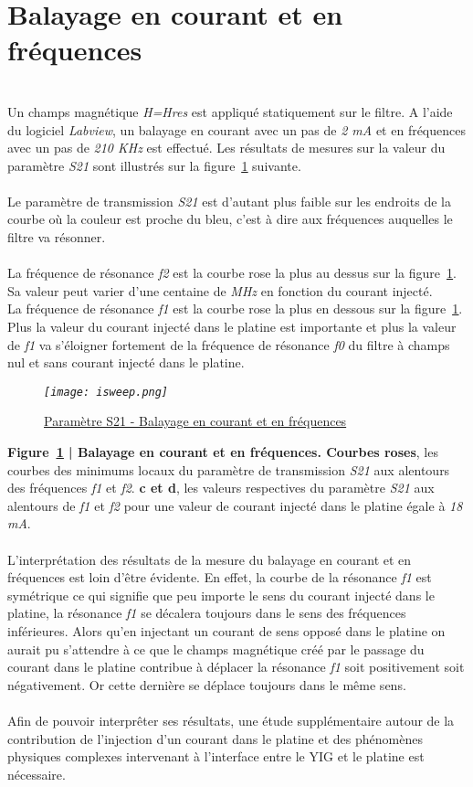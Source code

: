 \documentclass[12pt,fleqn]{book} %
\begin{document}
\section{Balayage en courant et en fréquences}
~\\
\noindent Un champs magnétique \emph{H=Hres} est appliqué statiquement sur le filtre. A l'aide du logiciel \emph{Labview}, un balayage en courant avec un pas de \emph{2 mA} et en fréquences avec un pas de \emph{210 KHz} est effectué. Les résultats de mesures sur la valeur du paramètre \emph{S21} sont illustrés sur la figure~\underline{\color{blue}\ref{isweep}} suivante.
~\\\\Le paramètre de transmission \emph{S21} est d'autant plus faible sur les endroits de la courbe où la couleur est proche du bleu, c'est à dire aux fréquences auquelles le filtre va résonner.
~\\\\La fréquence de résonance \emph{f2} est la courbe rose la plus au dessus sur la figure~\underline{\color{blue}\ref{isweep}}. Sa valeur peut varier d'une centaine de \emph{MHz} en fonction du courant injecté.
~\\La fréquence de résonance \emph{f1} est la courbe rose la plus en dessous sur la figure~\underline{\color{blue}\ref{isweep}}. Plus la valeur du courant injecté dans le platine est importante et plus la valeur de \emph{f1} va s'éloigner fortement de la fréquence de résonance \emph{f0} du filtre à champs nul et sans courant injecté dans le platine.
\begin{figure}[H]
	\centering
	\itshape
	\texttt{[image: isweep.png]}
	\caption{\label{isweep} \underline{Paramètre S21 - Balayage en courant et en fréquences}}
\end{figure}
\noindent\footnotesize\textbf{Figure~\underline{\color{blue}\ref{isweep}} | Balayage en courant et en fréquences. Courbes roses}, les courbes des minimums locaux du paramètre de transmission \emph{S21} aux alentours des fréquences \emph{f1} et \emph{f2}. \textbf{c et d}, les valeurs respectives du paramètre \emph{S21} aux alentours de \emph{f1} et  \emph{f2} pour une valeur de courant injecté dans le platine égale à \emph{18 mA}.
\normalsize
~\\\\L'interprétation des résultats de la mesure du balayage en courant et en fréquences est loin d'être évidente. En effet, la courbe de la résonance \emph{f1} est symétrique ce qui signifie que peu importe le sens du courant injecté dans le platine, la résonance \emph{f1} se décalera toujours dans le sens des fréquences inférieures. Alors qu'en injectant un courant de sens opposé dans le platine on aurait pu s'attendre à ce que le champs magnétique créé par le passage du courant dans le platine contribue à déplacer la résonance \emph{f1} soit positivement soit négativement. Or cette dernière se déplace toujours dans le même sens.
~\\\\Afin de pouvoir interprêter ses résultats, une étude supplémentaire autour de la contribution de l'injection d'un courant dans le platine et des phénomènes physiques complexes intervenant à l'interface entre le YIG et le platine est nécessaire.
\end{document}
